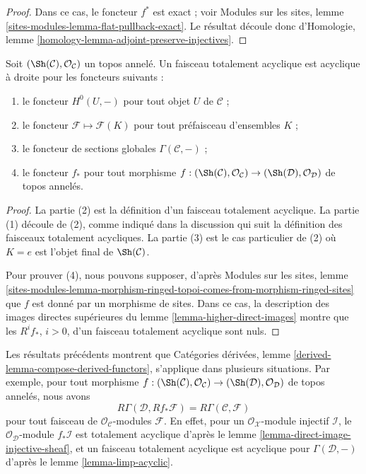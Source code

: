 \begin{proof}
Dans ce cas, le foncteur $f^*$ est exact ; voir Modules sur les sites,
lemme \ref{sites-modules-lemma-flat-pullback-exact}.
Le résultat découle donc d'Homologie,
lemme \ref{homology-lemma-adjoint-preserve-injectives}.
\end{proof}

\begin{lemma}
\label{lemma-limp-acyclic}
Soit $(\Sh(\mathcal{C}), \mathcal{O}_\mathcal{C})$ un topos annelé.
Un faisceau totalement acyclique est acyclique à droite pour les foncteurs
suivants :
\begin{enumerate}
\item le foncteur $H^0(U, -)$ pour tout objet $U$ de $\mathcal{C}$ ;
\item le foncteur $\mathcal{F} \mapsto \mathcal{F}(K)$ pour tout préfaisceau
d'ensembles $K$ ;
\item le foncteur de sections globales $\Gamma(\mathcal{C}, -)$ ;
\item le foncteur $f_*$ pour tout morphisme
$f : (\Sh(\mathcal{C}), \mathcal{O}_\mathcal{C}) \to
(\Sh(\mathcal{D}), \mathcal{O}_\mathcal{D})$ de topos annelés.
\end{enumerate}
\end{lemma}

\begin{proof}
La partie (2) est la définition d'un faisceau totalement acyclique.
La partie (1) découle de (2), comme indiqué dans la discussion qui suit la
définition des faisceaux totalement acycliques.
La partie (3) est le cas particulier de (2) où $K = e$ est l'objet final de
$\Sh(\mathcal{C})$.

\medskip\noindent
Pour prouver (4), nous pouvons supposer, d'après Modules sur les sites, lemme
\ref{sites-modules-lemma-morphism-ringed-topoi-comes-from-morphism-ringed-sites}
que $f$ est donné par un morphisme de sites. Dans ce cas, la description des
images directes supérieures du lemme \ref{lemma-higher-direct-images} montre
que les $R^if_*$, $i > 0$, d'un faisceau totalement acyclique sont nuls.
\end{proof}

\begin{remark}
\label{remark-before-Leray}
Les résultats précédents montrent que Catégories dérivées,
lemme \ref{derived-lemma-compose-derived-functors}, s'applique dans plusieurs
situations. Par exemple, pour tout morphisme
$f : (\Sh(\mathcal{C}), \mathcal{O}_\mathcal{C}) \to
(\Sh(\mathcal{D}), \mathcal{O}_\mathcal{D})$ de topos annelés, nous avons
$$
R\Gamma(\mathcal{D}, Rf_*\mathcal{F}) = R\Gamma(\mathcal{C}, \mathcal{F})
$$
pour tout faisceau de $\mathcal{O}_\mathcal{C}$-modules $\mathcal{F}$.
En effet, pour un $\mathcal{O}_\mathcal{X}$-module injectif $\mathcal{I}$, le
$\mathcal{O}_\mathcal{D}$-module $f_*\mathcal{I}$ est totalement acyclique
d'après le lemme \ref{lemma-direct-image-injective-sheaf}, et un faisceau
totalement acyclique est acyclique pour $\Gamma(\mathcal{D}, -)$ d'après le
lemme \ref{lemma-limp-acyclic}.
\end{remark}

